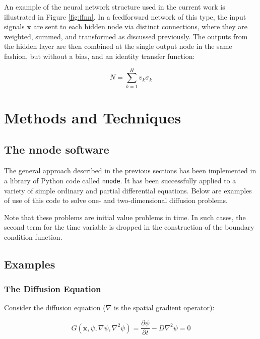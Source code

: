 \documentclass{article}
\begin{document}
An example of the neural network structure used in the current work is illustrated in Figure \ref{fig:ffnn}. In a feedforward network of this type, the input signals $\mathbf x$ are sent to each hidden node via distinct connections, where they are weighted, summed, and transformed as discussed previously. The outputs from the hidden layer are then combined at the single output node in the same fashion, but without a bias, and an identity transfer function:

\begin{equation}
  N = \sum_{k=1}^H v_k \sigma_k
\end{equation}


\newpage

\section{Methods and Techniques}

\subsection{The nnode software}

The general approach described in the previous sections has been implemented in a library of Python code called \texttt{nnode}. It has been successfully applied to a variety of simple ordinary and partial differential equations. Below are examples of use of this code to solve one- and two-dimensional diffusion problems.

Note that these problems are initial value problems in time. In such cases, the second term for the time variable is dropped in the construction of the boundary condition function.

\subsection{Examples}

\subsubsection{The Diffusion Equation}

Consider the diffusion equation ($\nabla$ is the spatial gradient operator):

\begin{equation}
  G \left( \mathbf x, \psi, \nabla \psi, \nabla^2 \psi \right) = \frac {\partial \psi} {\partial t} - D \nabla^2 \psi = 0
\end{equation}
\end{document}
